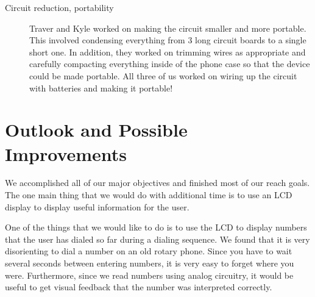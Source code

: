 \documentclass{es50report}
\begin{document}
\begin{description}
            \item[Circuit reduction, portability]
                Traver and Kyle worked on making the circuit smaller and more portable. This involved condensing everything from 3 long circuit boards to a single short one. In addition, they worked on trimming wires as appropriate and carefully compacting everything inside of the phone case so that the device could be made portable. All three of us worked on wiring up the circuit with batteries and making it portable!
        \end{description}

    \section{Outlook and Possible Improvements}
        \begin{description}
            \setlength{\parskip}{2mm}
            \item[LCD display]
                We accomplished all of our major objectives and finished most of our reach goals. The one main thing that we would do with additional time is to use an LCD display to display useful information for the user.

                One of the things that we would like to do is to use  the LCD to display numbers that the user has dialed so far during a dialing sequence. We found that it is very disorienting to dial a number on an old rotary phone. Since you have to wait several seconds between entering numbers, it is very easy to forget where you were. Furthermore, since we read numbers using analog circuitry, it would be useful to get visual feedback that the number was interpreted correctly.


\end{description}
\end{document}
